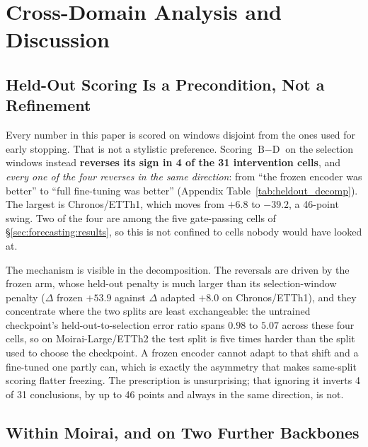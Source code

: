 \section{Cross-Domain Analysis and Discussion}
\label{sec:analysis}

\subsection{Held-Out Scoring Is a Precondition, Not a Refinement}
\label{sec:analysis:heldout}

Every number in this paper is scored on windows disjoint from the ones used
for early stopping.  That is not a stylistic preference.  Scoring
$\text{B}{-}\text{D}$ on the selection windows instead \textbf{reverses its
sign in 4 of the 31 intervention cells}, and \emph{every one of the four
reverses in the same direction}: from ``the frozen encoder was better'' to
``full fine-tuning was better'' (Appendix Table~\ref{tab:heldout_decomp}).  The largest
is Chronos/ETTh1, which moves from $+6.8$ to $-39.2$, a 46-point swing.  Two
of the four are among the five gate-passing cells of
\S\ref{sec:forecasting:results}, so this is not confined to cells nobody would
have looked at.

The mechanism is visible in the decomposition.  The reversals are driven by
the frozen arm, whose held-out penalty is much larger than its selection-window
penalty ($\Delta$ frozen $+53.9$ against $\Delta$ adapted $+8.0$ on
Chronos/ETTh1), and they concentrate where the two splits are least
exchangeable: the untrained checkpoint's held-out-to-selection error ratio
spans $0.98$ to $5.07$ across these four cells, so on Moirai-Large/ETTh2 the
test split is five times harder than the split used to choose the checkpoint.
A frozen encoder cannot adapt to that shift and a fine-tuned one partly can,
which is exactly the asymmetry that makes same-split scoring flatter freezing.
The prescription is unsurprising; that ignoring it inverts 4 of 31 conclusions,
by up to 46 points and always in the same direction, is not.

\subsection{Within Moirai, and on Two Further Backbones}
\label{sec:forecasting:nonmoirai}

